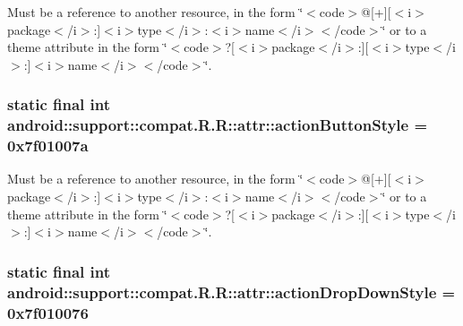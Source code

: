 Must be a reference to another resource, in the form \char`\"{}$<$code$>$@\mbox{[}+\mbox{]}\mbox{[}$<$i$>$package$<$/i$>$:\mbox{]}$<$i$>$type$<$/i$>$:$<$i$>$name$<$/i$>$$<$/code$>$\char`\"{} or to a theme attribute in the form \char`\"{}$<$code$>$?\mbox{[}$<$i$>$package$<$/i$>$:\mbox{]}\mbox{[}$<$i$>$type$<$/i$>$:\mbox{]}$<$i$>$name$<$/i$>$$<$/code$>$\char`\"{}. \hypertarget{classandroid_1_1support_1_1compat_1_1_r_1_1attr_1b354c3d65828db6619c7d50ce243b3c}{
\subsubsection[{actionButtonStyle}]{\setlength{\rightskip}{0pt plus 5cm}static final int android::support::compat.R.R::attr::actionButtonStyle = 0x7f01007a}}
\label{classandroid_1_1support_1_1compat_1_1_r_1_1attr_1b354c3d65828db6619c7d50ce243b3c}


Must be a reference to another resource, in the form \char`\"{}$<$code$>$@\mbox{[}+\mbox{]}\mbox{[}$<$i$>$package$<$/i$>$:\mbox{]}$<$i$>$type$<$/i$>$:$<$i$>$name$<$/i$>$$<$/code$>$\char`\"{} or to a theme attribute in the form \char`\"{}$<$code$>$?\mbox{[}$<$i$>$package$<$/i$>$:\mbox{]}\mbox{[}$<$i$>$type$<$/i$>$:\mbox{]}$<$i$>$name$<$/i$>$$<$/code$>$\char`\"{}. \hypertarget{classandroid_1_1support_1_1compat_1_1_r_1_1attr_d5028cd4f5608b7f0f9c3c4cafce2cc2}{
\subsubsection[{actionDropDownStyle}]{\setlength{\rightskip}{0pt plus 5cm}static final int android::support::compat.R.R::attr::actionDropDownStyle = 0x7f010076}}
\label{classandroid_1_1support_1_1compat_1_1_r_1_1attr_d5028cd4f5608b7f0f9c3c4cafce2cc2}


